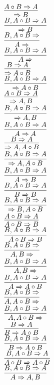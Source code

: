 \documentclass[11pt]{article}
\begin{document}
\begin{center}

$\infer{\Rightarrow B}{A\circ B\Rightarrow A}$
\bigskip
\\$\infer{\Rightarrow B}{B, A\circ B\Rightarrow A}$
\bigskip
\\$\infer{A\Rightarrow }{B, A\circ B\Rightarrow }$
\bigskip
\\$\infer{A\Rightarrow }{B, A\circ B\Rightarrow A}$
\bigskip
\\$\infer{\Rightarrow A\circ B}{B\Rightarrow A}$
\bigskip
\\$\infer{\Rightarrow A\circ B}{B, A\circ B\Rightarrow A}$
\bigskip
\\$\infer{\Rightarrow A, B}{A\circ B\Rightarrow A}$
\bigskip
\\$\infer{\Rightarrow A, B}{B, A\circ B\Rightarrow A}$
\bigskip
\\$\infer{A\Rightarrow A}{B, A\circ B\Rightarrow A}$
\bigskip
\\$\infer{\Rightarrow A, A\circ B}{B\Rightarrow A}$
\bigskip
\\$\infer{\Rightarrow A, A\circ B}{B, A\circ B\Rightarrow A}$
\bigskip
\\$\infer{A\Rightarrow B}{B, A\circ B\Rightarrow A}$
\bigskip
\\$\infer{B\Rightarrow B}{B, A\circ B\Rightarrow A}$
\bigskip
\\$\infer{\Rightarrow B, A\circ B}{B, A\circ B\Rightarrow A}$
\bigskip
\\$\infer{A\circ B\Rightarrow B}{A\circ B\Rightarrow A}$
\bigskip
\\$\infer{A\circ B\Rightarrow B}{B, A\circ B\Rightarrow A}$
\bigskip
\\$\infer{A, B\Rightarrow }{B, A\circ B\Rightarrow }$
\bigskip
\\$\infer{A, B\Rightarrow }{B, A\circ B\Rightarrow A}$
\bigskip
\\$\infer{A\Rightarrow A\circ B}{B, A\circ B\Rightarrow A}$
\bigskip
\\$\infer{A, A\circ B\Rightarrow }{B, A\circ B\Rightarrow }$
\bigskip
\\$\infer{A, A\circ B\Rightarrow }{B, A\circ B\Rightarrow A}$
\bigskip
\\$\infer{B\Rightarrow A\circ B}{B\Rightarrow A}$
\bigskip
\\$\infer{B\Rightarrow A\circ B}{B, A\circ B\Rightarrow A}$
\bigskip
\\$\infer{A\circ B\Rightarrow A\circ B}{B, A\circ B\Rightarrow A}$
\bigskip
\\$\infer{A\Rightarrow A, B}{B, A\circ B\Rightarrow A}$

\end{center}
\end{document}
